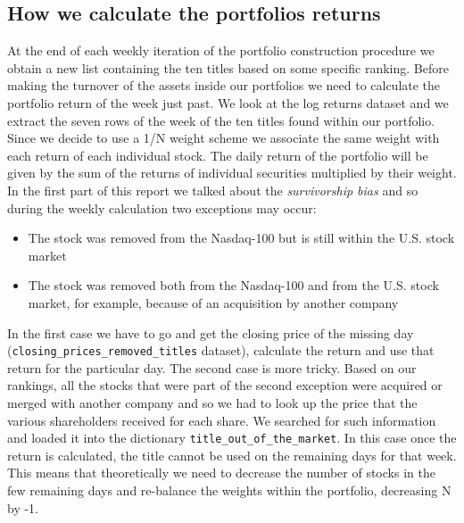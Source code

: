 \documentclass[twocolumn]{article}
\begin{document}
\subsection{How we calculate the portfolios returns}
At the end of each weekly iteration of the portfolio construction procedure we obtain a new list containing the ten titles based on some specific ranking. Before making the turnover of the assets inside our portfolios we need to calculate the portfolio return of the week just past. We look at the log returns dataset and we extract the seven rows of the week of the ten titles found within our portfolio. Since we decide to use a 1/N weight scheme we associate the same weight with each return of each individual stock. The daily return of the portfolio will be given by the sum of the returns of individual securities multiplied by their weight. In the first part of this report we talked about the \textit{survivorship bias} and so during the weekly calculation two exceptions may occur:
\begin{itemize}
    \item The stock was removed from the Nasdaq-100 but is still within the U.S. stock market
    \item The stock was removed both from the Nasdaq-100 and from the U.S. stock market, for example, because of an acquisition by another company
\end{itemize}
In the first case we have to go and get the closing price of the missing day (\texttt{closing\_prices\_removed\_titles} dataset), calculate the return and use that return for the particular day. The second case is more tricky. Based on our rankings, all the stocks that were part of the second exception were acquired or merged with another company and so we had to look up the price that the various shareholders received for each share. We searched for such information and loaded it into the dictionary \texttt{title\_out\_of\_the\_market}. In this case once the return is calculated, the title cannot be used on the remaining days for that week. This means that theoretically we need to decrease the number of stocks in the few remaining days and re-balance the weights within the portfolio, decreasing N by -1.
\end{document}

